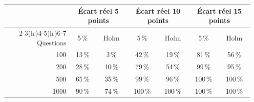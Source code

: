 \begin{tabular}{@{}rcccccc@{}}
\toprule
& \multicolumn{2}{c}{Écart réel 5 points} & \multicolumn{2}{c}{Écart réel 10 points} & \multicolumn{2}{c}{Écart réel 15 points}\\
\cmidrule(lr){2-3}\cmidrule(lr){4-5}\cmidrule(lr){6-7}
Questions & 5\,\% & Holm & 5\,\% & Holm & 5\,\% & Holm\\
\midrule
100 & 13\,\% & 3\,\% & 42\,\% & 19\,\% & 81\,\% & 56\,\%\\
200 & 28\,\% & 10\,\% & 79\,\% & 54\,\% & 99\,\% & 95\,\%\\
500 & 65\,\% & 35\,\% & 99\,\% & 96\,\% & 100\,\% & 100\,\%\\
1000 & 90\,\% & 74\,\% & 100\,\% & 100\,\% & 100\,\% & 100\,\%\\
\bottomrule
\end{tabular}
